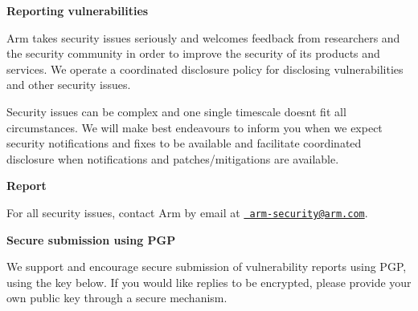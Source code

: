 {\bfseries{Reporting vulnerabilities}}

Arm takes security issues seriously and welcomes feedback from researchers and the security community in order to improve the security of its products and services. We operate a coordinated disclosure policy for disclosing vulnerabilities and other security issues.

Security issues can be complex and one single timescale doesn\textquotesingle{}t fit all circumstances. We will make best endeavours to inform you when we expect security notifications and fixes to be available and facilitate coordinated disclosure when notifications and patches/mitigations are available.

{\bfseries{Report}}

For all security issues, contact Arm by email at \href{mailto:arm-security@arm.com}{\texttt{ arm-\/security@arm.\+com}}.

{\bfseries{Secure submission using P\+GP}}

We support and encourage secure submission of vulnerability reports using P\+GP, using the key below. If you would like replies to be encrypted, please provide your own public key through a secure mechanism.


